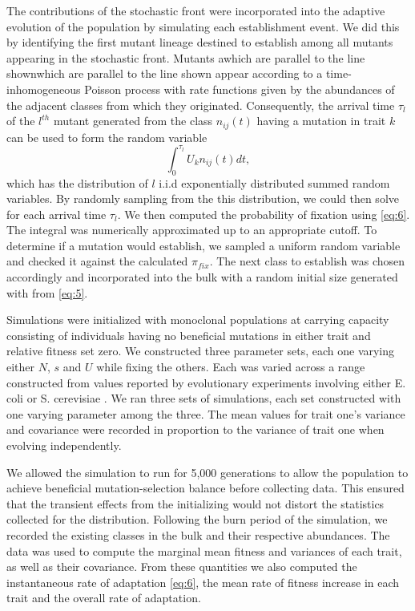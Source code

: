 \documentclass[11pt,twocolumn]{article}
\begin{document}
The contributions of the stochastic front were incorporated into the adaptive evolution of the population by simulating each establishment event. We did this by identifying the first mutant lineage destined to establish among all mutants appearing in the stochastic front. Mutants awhich are parallel to the line shownwhich are parallel to the line shown appear according to a time-inhomogeneous Poisson process with rate functions given by the abundances of the adjacent classes from which they originated. Consequently, the arrival time $\tau_l$ of the $l^{th}$ mutant generated from the class $n_{ij}(t)$ having a mutation in trait $k$ can be used to form the random variable
% 
% 
\[ 
\int_0^{\tau_l} U_k n_{ij}(t) dt ,
\] 
which has the distribution of $l$ i.i.d exponentially distributed summed random variables. By randomly sampling from the this distribution, we could then solve for each arrival time $\tau_l$. We then computed the probability of fixation using \eqref{eq:6}. The integral was numerically approximated up to an appropriate cutoff.  To determine if a mutation would establish, we sampled a uniform random variable and checked it against the calculated $\pi_{fix}$. The next class to establish was chosen accordingly and incorporated into the bulk with a random initial size generated with from \eqref{eq:5}.\par
% 
% 

Simulations were initialized with monoclonal populations at carrying capacity consisting of individuals having no beneficial mutations in either trait and relative fitness set zero. We constructed three parameter sets, each one varying either $N$, $s$ and $U$ while fixing the others. Each was varied across a range constructed from values reported by evolutionary experiments involving either E. coli or S. cerevisiae \citep{desai2007speed,Levy2015,Perfeito2007}. We ran three sets of simulations, each set constructed with one varying parameter among the three. The mean values for trait one's variance and covariance were recorded in proportion to the variance of trait one when evolving independently.  

We allowed the simulation to run for 5,000 generations to allow the population to achieve beneficial mutation-selection balance before collecting data. This ensured that the transient effects from the initializing would not distort the statistics collected for the distribution. Following the burn period of the simulation, we recorded the existing classes in the bulk and their respective abundances. The data was used to compute the marginal mean fitness and variances of each trait, as well as their covariance. From these quantities we also computed the instantaneous rate of adaptation \eqref{eq:6}, the mean rate of fitness increase in each trait and the overall rate of adaptation.
\end{document}

